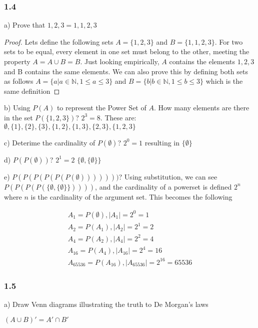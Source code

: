 \documentclass[]{report}
\begin{document}
\subsubsection{1.4}

a) Prove that ${1, 2, 3} = {1, 1, 2, 3}$

\begin{proof}
Lets define the following sets
$A = \{1, 2, 3\}$ and $B = \{1, 1, 2, 3\}$. For two sets to be equal, every element in one set must belong to the other, meeting the property $A = A \cup B = B$.
Just looking empirically, $A$ contains the elements $1, 2, 3$ and B contains the same elements. 
We can also prove this by defining both sets as follows
$A = \{a | a \in \mathbb{N},  1 \leq a \leq 3\}$ and $B = \{b | b \in \mathbb{N},  1 \leq b \leq 3\}$ which is the same definition
\end{proof}

b) Using $P(A)$ to represent the Power Set of $A$. How many elements are there in the set $P(\{1,2,3\})$? $2^3 = 8$. These are: $\emptyset, \{1\}, \{2\}, \{3\}, \{1, 2\}, \{1, 3\}, \{2, 3\}, \{1, 2, 3\}$

c)  Deterime the cardinality of $P(\emptyset)$? $2^0 = 1$ resulting in $\{\emptyset\}$

d) $P(P(\emptyset))$? $2^1 = 2$ $\{\emptyset, \{\emptyset\}\}$

e)  $P(P(P(P(P(P(\emptyset)))))))$? Using substitution, we can see $P(P(P(P(\{\emptyset, \{\emptyset\}\}))))$, and the cardinality of a powerset is defined $2^n$ where  $n$ is the cardinality of the  argument set.  This becomes the following

\begin{align*}
A_1 = P(\emptyset), |A_1| = 2^0 = 1\\
A_2 = P(A_1), |A_2| = 2^1 = 2 \\
A_4 = P(A_2), |A_4| = 2^2 = 4 \\
A_16 = P(A_4), |A_ 16| = 2^4 = 16 \\
A_65536 = P(A_16), |A_ 65536| = 2^16 = 65536
\end{align*}

\subsubsection{1.5}

a) Draw Venn diagrams illustrating the truth to De Morgan's laws

$(A \cup B)' = A' \cap  B'$
\end{document}
